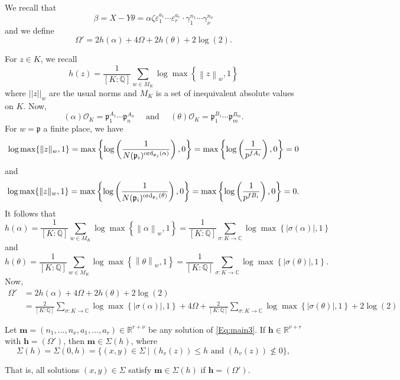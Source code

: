 We recall that  
\[\beta = X-Y\theta = \alpha \zeta \varepsilon_1^{a_1} \cdots \varepsilon_r^{a_r}\cdot \gamma_1^{n_1}\cdots \gamma_{\nu}^{n_{\nu}}\]
and we define
\[\Omega' = 2h(\alpha) + 4\Omega + 2h(\theta) + 2\log(2).\]

For $z \in K$, we recall
\[h(z)=\frac{1}{[K:\mathbb{Q}]}\sum_{w \in M_K} \log \max \left\{ \left\|z\right\|_{w}, 1\right\}\]
where $||z||_w$ are the usual norms and $M_K$ is a set of inequivalent absolute values on $K$. Now, 
\[(\alpha)\mathcal{O}_K = \mathfrak{p}_1^{A_1} \cdots \mathfrak{p}_n^{A_n} \quad \text{ and } \quad (\theta)\mathcal{O}_K = \mathfrak{p}_1^{B_1} \cdots \mathfrak{p}_m^{B_m}.\]
For $w = \mathfrak{p}$ a finite place, we have
\[ \log \max \{ \|z\|_{w}, 1\} = \max \left\{ \log\left(\frac{1}{N(\mathfrak{p}_i)^{\operatorname{ord}_{\mathfrak{p}_i}(\alpha)}} \right), 0\right\} = \max \left\{ \log\left(\frac{1}{p^{fA_i}} \right), 0\right\} = 0\]
and 
\[ \log \max \{ \|z\|_{w}, 1\} = \max \left\{ \log\left(\frac{1}{N(\mathfrak{p}_i)^{\operatorname{ord}_{\mathfrak{p}_i}(\theta)}} \right), 0\right\} = \max \left\{ \log\left(\frac{1}{p^{fB_i}} \right), 0\right\} = 0.\]
It follows that
\[h(\alpha)=\frac{1}{[K:\mathbb{Q}]}\sum_{w \in M_K} \log \max \left\{ \left\|\alpha\right\|_{w}, 1\right\}
	= \frac{1}{[K:\mathbb{Q}]}\sum_{\sigma:K \to \mathbb{C}} \log \max \left\{ |\sigma(\alpha)|, 1\right\}
\]
and 
\[h(\theta)=\frac{1}{[K:\mathbb{Q}]}\sum_{w \in M_K} \log \max \left\{ \left\|\theta\right\|_{w}, 1\right\}
	= \frac{1}{[K:\mathbb{Q}]}\sum_{\sigma:K \to \mathbb{C}} \log \max \left\{ |\sigma(\theta)|, 1\right\}.
\]
Now, 
\begin{align*}
\Omega'	
	& = 2h(\alpha) + 4\Omega + 2h(\theta) + 2\log(2)\\
	& = \frac{2}{[K:\mathbb{Q}]}\sum_{\sigma:K \to \mathbb{C}} \log \max \left\{ |\sigma(\alpha)|, 1\right\} + 4\Omega + \frac{2}{[K:\mathbb{Q}]}\sum_{\sigma:K \to \mathbb{C}} \log \max \left\{ |\sigma(\theta)|, 1\right\} + 2\log(2)
\end{align*}

\begin{lemma}
Let ${\mathbf{m} = (n_1, \dots, n_{\nu}, a_1, \dots, a_r) \in \mathbb{R}^{r + \nu}}$ be any solution of \eqref{Eq:main3}. If $\mathbf{h} \in\mathbb{R}^{\nu + r}$ with $\mathbf{h} = (\Omega')$, then $\mathbf{m}\in \Sigma(h)$, where
\[\Sigma(h) = \Sigma(0,h)= \{(x,y) \in \Sigma \ | \ (h_v(z))\leq h \text{ and }  (h_v(z))\nleq 0 \},\]
\end{lemma}
That is, all solutions $(x,y) \in \Sigma$ satisfy $\mathbf{m}\in \Sigma(h)$ if $\mathbf{h} = (\Omega')$.

